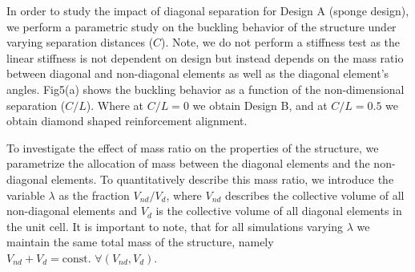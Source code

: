 \documentclass[9pt,twocolumn,twoside]{fernandes_paper}
\begin{document}
In order to study the impact of diagonal separation for Design A (sponge design), we perform a parametric study on the buckling behavior of the structure under varying separation distances ($C$). Note, we do not perform a stiffness test as the linear stiffness is not dependent on design but instead depends on the mass ratio between diagonal and non-diagonal elements as well as the diagonal element's angles. {Fig5}(a) shows the buckling behavior as a function of the non-dimensional separation ($C/L$). Where at $C/L=0$ we obtain Design B, and at $C/L=0.5$ we obtain diamond shaped reinforcement alignment. 




To investigate the effect of mass ratio on the properties of the structure, we parametrize the allocation of mass between the diagonal elements and the non-diagonal elements. To quantitatively describe this mass ratio, we introduce the variable $\lambda$ as the fraction $V_{nd}/V_d$, where $V_{nd}$ describes the collective volume of all non-diagonal elements and $V_d$ is the collective volume of all diagonal elements in the unit cell. It is important to note, that for all simulations varying $\lambda$ we maintain the same total mass of the structure, namely $V_{nd}+V_d=\mbox{const. } \forall (V_{nd},V_d)$. 
\end{document}
